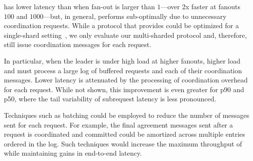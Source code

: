 \system has lower latency than \mpaxos when fan-out is larger than $1$---over 2x
faster at fanouts $100$ and $1000$---but, in general, performs sub-optimally due
to unnecessary coordination requests. While a protocol that provides \mdl could
be optimized for a single-shard setting~\cite{ongaro2014consensus}, we only evaluate
our multi-sharded protocol and, therefore, still issue coordination messages for
each request.

In particular, when the leader is under high load at higher fanouts, higher load
and must process a large log of buffered requests and each of their coordination
messages. Lower latency is attenuated by the processing of coordination overhead
for each request. While not shown, this improvement is even greater for p90 and
p50, where the tail variability of subrequest latency is less pronounced.

Techniques such as batching could be employed to reduce the number of messages
sent for each request. For example, the final agreement messages sent after a
request is coordinated and committed could be amortized across multiple entries
ordered in the log. Such techniques would increase the maximum throughput of
\protocol while maintaining gains in end-to-end latency.

